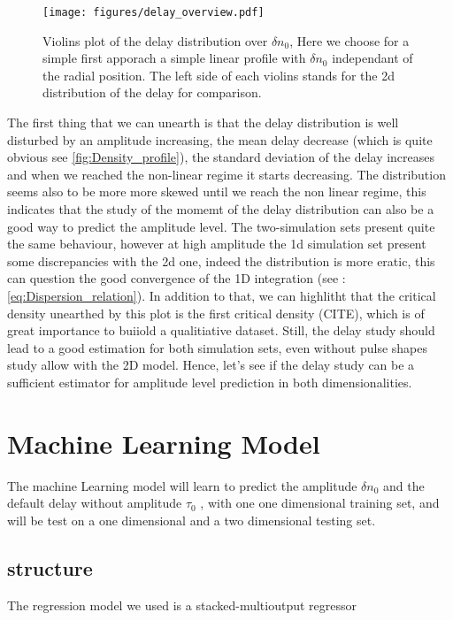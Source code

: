 \documentclass[11pt,a4paper,openany]{report}
\begin{document}
\begin{multicols}{2}
    \begin{figure}[H]
        \centering
        \texttt{[image: figures/delay\_overview.pdf]}
        \caption{Violins plot of the delay distribution over $\delta n_0$, Here we choose for a simple first apporach a simple linear profile with $\delta n_0$ independant of the radial position. The left side of each violins stands for the 2d distribution of the delay for comparison.}
        \label{fig:Violins_delay}
    \end{figure}
    The first thing that we can unearth is that the delay distribution is well disturbed by an amplitude increasing, the mean delay decrease (which is quite obvious see \ref{fig:Density_profile}), the standard deviation of the delay increases and when we reached the non-linear regime it starts decreasing. The distribution seems also to be more more skewed until we reach the non linear regime, this indicates that the study of the momemt of the delay distribution can also be a good way to predict the amplitude level. The two-simulation sets present quite the same behaviour, however at high amplitude the 1d simulation set present some discrepancies with the 2d one, indeed the distribution is more eratic, this can question the good convergence of the 1D integration (see : \ref{eq:Dispersion_relation}). In addition to that, we can highlitht that the critical density unearthed by this plot is the first critical density (CITE), which is of great importance to buiiold a qualitiative dataset. Still, the delay study should lead to a good estimation for both simulation sets, even without pulse shapes study allow with the 2D model.
    Hence, let's see if the delay study can be a sufficient estimator for amplitude level prediction in both dimensionalities.

    \section{Machine Learning Model}
    The machine Learning model will learn to predict the amplitude $\delta n_0 $ and the default delay without amplitude $\tau_0 $ , with one one dimensional training set, and will be test on a one dimensional and a two dimensional testing set.
    \subsection{structure}

    The regression model we used is a stacked-multioutput regressor


\end{multicols}
\end{document}
